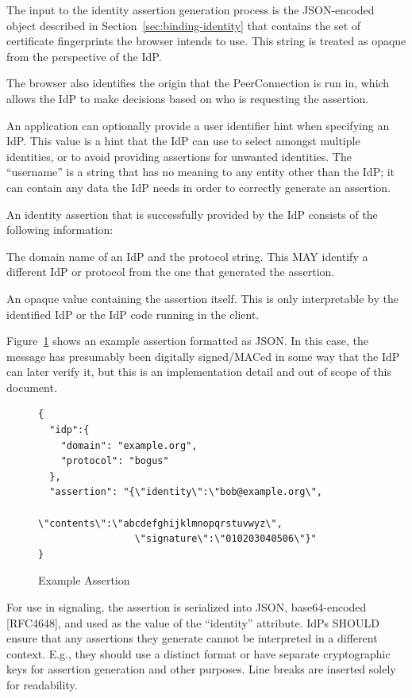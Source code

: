 \documentclass{article}
\begin{document}
The input to the identity assertion generation process is the JSON-encoded object described in Section~\ref{sec:binding-identity} that contains the set of
certificate fingerprints the browser intends to use.  This string is
treated as opaque from the perspective of the IdP.

The browser also identifies the origin that the PeerConnection is run
in, which allows the IdP to make decisions based on who is requesting
the assertion.

An application can optionally provide a user identifier hint when
specifying an IdP.  This value is a hint that the IdP can use to
select amongst multiple identities, or to avoid providing assertions
for unwanted identities.  The ``username'' is a string that has no
meaning to any entity other than the IdP; it can contain any data the
IdP needs in order to correctly generate an assertion.

An identity assertion that is successfully provided by the IdP
consists of the following information:

\begin{description}[style=nextline]
\item[idp:] The domain name of an IdP and the protocol string.  This MAY
  identify a different IdP or protocol from the one that generated
  the assertion.

\item[assertion:] An opaque value containing the assertion itself.  This is
  only interpretable by the identified IdP or the IdP code running
  in the client.
\end{description}

Figure~\ref{fig:example-assertion} shows an example assertion formatted as JSON.  In this case,
the message has presumably been digitally signed/MACed in some way
that the IdP can later verify it, but this is an implementation
detail and out of scope of this document.

\begin{figure}[ht]
\begin{verbatim}
{
  "idp":{
    "domain": "example.org",
    "protocol": "bogus"
  },
  "assertion": "{\"identity\":\"bob@example.org\",
                 \"contents\":\"abcdefghijklmnopqrstuvwyz\",
                 \"signature\":\"010203040506\"}"
}
\end{verbatim}
\caption{Example Assertion}
\label{fig:example-assertion}
\end{figure}

For use in signaling, the assertion is serialized into JSON,
base64-encoded [RFC4648], and used as the value of the ``identity''
attribute.  IdPs SHOULD ensure that any assertions they generate
cannot be interpreted in a different context.  E.g., they should use
a distinct format or have separate cryptographic keys for assertion
generation and other purposes.  Line breaks are inserted solely for
readability.
\end{document}
